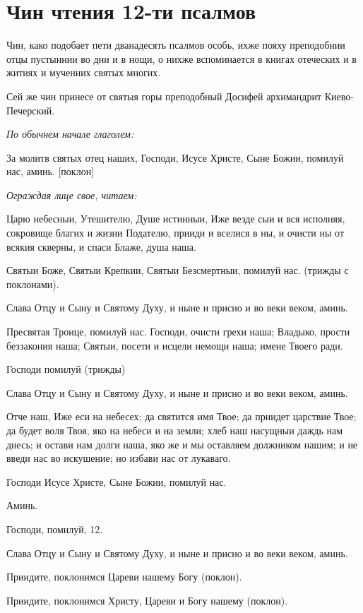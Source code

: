 \section{Чин чтения 12-ти псалмов}
 


Чин, како подобает пети дванадесять псалмов особь, ихже пояху преподобнии отцы пустыннии во дни и в нощи, о нихже вспоминается в книгах отеческих и в житиях и мучениих святых многих.


Сей же чин принесе от святыя горы преподобный Досифей архимандрит Киево-Печерский.


\itshape По обычнем начале глаголем: \normalfont{}


За молитв святых отец наших, Господи, Исусе Христе, Сыне Божии, помилуй нас, аминь. [поклон]


\itshape Ограждая лице свое, читаем:\normalfont{}


Царю небесныи, Утешителю, Душе истинныи, Иже везде сыи и вся исполняя, сокровище благих и жизни Подателю, прииди и вселися в ны, и очисти ны от всякия скверны, и спаси Блаже, душа наша.

Святыи Боже, Святыи Крепкии, Святыи Безсмертныи, помилуй нас. (трижды с поклонами).

Слава Отцу и Сыну и Святому Духу, и ныне и присно и во веки веком, аминь.

Пресвятая Троице, помилуй нас. Господи, очисти грехи наша; Владыко, прости беззакония наша; Святыи, посети и исцели немощи наша; имене Твоего ради.

Господи помилуй (трижды)

Слава Отцу и Сыну и Святому Духу, и ныне и присно и во веки веком, аминь.

Отче наш, Иже еси на небесех; да святится имя Твое; да приидет царствие Твое; да будет воля Твоя, яко на небеси и на земли; хлеб наш насущныи даждь нам днесь; и остави нам долги наша, яко же и мы оставляем должником нашим; и не введи нас во искушение; но избави нас от лукаваго.

Господи Исусе Христе, Сыне Божии, помилуй нас.

Аминь.

Господи, помилуй, 12.

Слава Отцу и Сыну и Святому Духу, и ныне и присно и во веки веком, аминь.

Приидите, поклонимся Цареви нашему Богу (поклон).

Приидите, поклонимся Христу, Цареви и Богу нашему (поклон).

